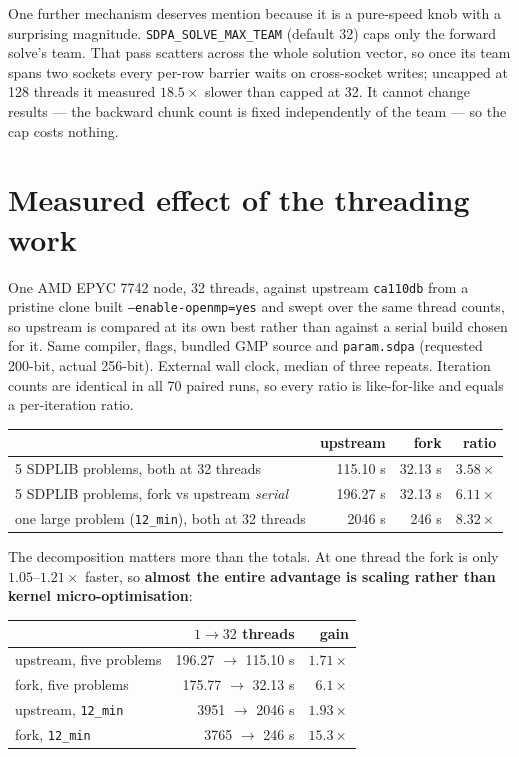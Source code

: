\documentclass[11pt]{article}
\newcommand{\code}[1]{\texttt{#1}}
\begin{document}
One further mechanism deserves mention because it is a pure-speed knob with a surprising
magnitude. \code{SDPA\_SOLVE\_MAX\_TEAM} (default 32) caps only the forward solve's team. That
pass scatters across the whole solution vector, so once its team spans two sockets every per-row
barrier waits on cross-socket writes; uncapped at 128 threads it measured $18.5\times$ slower
than capped at 32. It cannot change results --- the backward chunk count is fixed independently
of the team --- so the cap costs nothing.

\section{Measured effect of the threading work}
\label{sec:measured}

One AMD EPYC 7742 node, 32 threads, against upstream \code{ca110db} from a pristine clone built
\code{--enable-openmp=yes} and swept over the same thread counts, so upstream is compared at its
own best rather than against a serial build chosen for it. Same compiler, flags, bundled GMP
source and \code{param.sdpa} (requested 200-bit, actual 256-bit). External wall clock, median of
three repeats. Iteration counts are identical in all 70 paired runs, so every ratio is
like-for-like and equals a per-iteration ratio.

\begin{center}
\begin{tabular}{lrrr}
\toprule
 & upstream & fork & ratio \\
\midrule
5 SDPLIB problems, both at 32 threads & 115.10 s & 32.13 s & $3.58\times$ \\
5 SDPLIB problems, fork vs upstream \emph{serial} & 196.27 s & 32.13 s & $6.11\times$ \\
one large problem (\code{12\_min}), both at 32 threads & 2046 s & 246 s & $8.32\times$ \\
\bottomrule
\end{tabular}
\end{center}

The decomposition matters more than the totals. At one thread the fork is only
$1.05$--$1.21\times$ faster, so \textbf{almost the entire advantage is scaling rather than kernel
micro-optimisation}:

\begin{center}
\begin{tabular}{lrr}
\toprule
 & $1 \to 32$ threads & gain \\
\midrule
upstream, five problems & 196.27 $\to$ 115.10 s & $1.71\times$ \\
fork, five problems & 175.77 $\to$ 32.13 s & $6.1\times$ \\
upstream, \code{12\_min} & 3951 $\to$ 2046 s & $1.93\times$ \\
fork, \code{12\_min} & 3765 $\to$ 246 s & $15.3\times$ \\
\bottomrule
\end{tabular}
\end{center}
\end{document}
